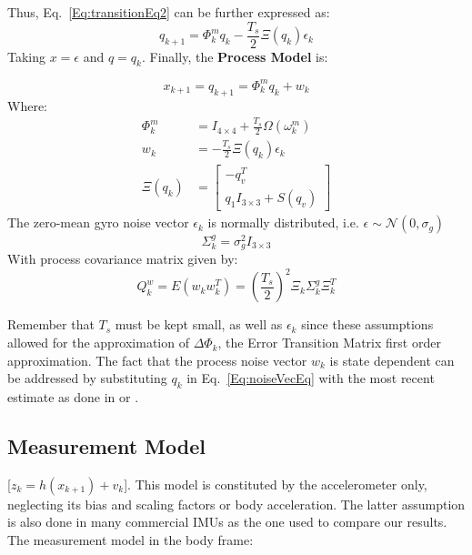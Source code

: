 \documentclass[a4paper,10pt]{article}
\begin{document}
  Thus, Eq.~\ref{Eq:transitionEq2} can be further expressed as:
  \begin{equation}
   q_{k+1} = \Phi^m_k q_k - \frac{T_s}{2} \Xi(q_k)\epsilon_k
  \end{equation}
  Taking $x = \epsilon$ and $q=q_k$.
  Finally, the \textbf{Process Model} is: 
  \begin{tcolorbox}
   \begin{equation}
    x_{k+1} = q_{k+1} = \Phi^m_k q_k + w_k
    \label{Eq:processModel}
   \end{equation}
   Where: 
   \begin{align}
    \Phi^m_k &= I_{4\times4} + \frac{T_s}{2}\Omega(\omega^m_k) \\
    w_k      &= -\frac{T_s}{2}\Xi(q_k)\epsilon_k \label{Eq:noiseVecEq}\\
    \Xi(q_k) &= \left[\begin{array}{c}
                -q^T_v \\
                q_1 I_{3\times3} + S(q_v)
               \end{array}\right]
   \end{align}
   The zero-mean gyro noise vector $\epsilon_k$ is normally distributed, i.e. $\epsilon \sim \mathcal{N}(0,\sigma_g)$
   \begin{equation}
    \Sigma^{g}_k = \sigma^2_{g} I_{3\times3}
   \end{equation}
   With process covariance matrix given by:
     \begin{equation}
      Q^w_k = E(w_k w^T_k) = \left(\frac{T_s}{2}\right)^2 \Xi_k \Sigma^{g}_k \Xi^T_k
     \end{equation}
  \end{tcolorbox}
  
  Remember that $T_s$ must be kept small, as well as $\epsilon_k$ since these assumptions allowed for the approximation of $\Delta \Phi_k$, the Error Transition Matrix first order approximation. 
  The fact that the process noise vector $w_k$ is state dependent can be addressed by substituting $q_k$ in Eq.~\ref{Eq:noiseVecEq} with the most recent estimate as done in \cite{Choukroun2003} or \cite{Sabatini2006}.

  \subsection{Measurement Model}
  [$z_{k} = h(x_{k+1}) + v_{k}$]. This model is constituted by the accelerometer only, neglecting its bias and scaling factors or body acceleration. The latter assumption is also done in many commercial IMUs as the one used to compare our results. The measurement model in the body frame:
  
\end{document}
